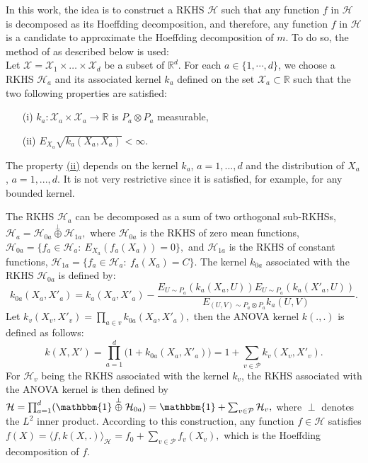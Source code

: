In this work, the idea is to construct a RKHS $\mathcal{H}$ such that any function $f$ in $\mathcal{H}$ is decomposed as its Hoeffding decomposition, and therefore, any function $f$ in $\mathcal{H}$ is a candidate to approximate the Hoeffding decomposition of $m$.  
To do so, the method of \citet{DURRANDE201357} as described below is used:\\ 
Let $\mathcal{X} = \mathcal{X}_{1} \times \ldots \times \mathcal{X}_{d}$ be a subset
of $\mathbb{R}^{d}$. For each $a\in \{1,\cdots,d\}$, we choose a RKHS  $\mathcal{H}_{a}$ and its associated kernel $k_{a}$ defined on the set $\mathcal{X}_{a} \subset \mathbb{R}$ such that the two following properties are satisfied:
\begin{itemize}
\item[(i)]\label{intro:idurr} $k_{a}:\mathcal{X}_{a} \times \mathcal{X}_{a} \rightarrow \mathbb{R}$ is $P_{a}\otimes P_{a}$ measurable,
\item[(ii)]\label{intro:iidurr} $E_{X_{a}}\sqrt{k_{a}(X_{a}, X_{a})} < \infty$.
\end{itemize}
The property \hyperref[intro:iidurr]{(ii)} depends on the kernel $k_a$, $a=1,...,d$ and the distribution of $X_a$, $a=1,...,d$. It is not very restrictive since it is satisfied, for example, for any bounded kernel.

The RKHS $\mathcal{H}_{a}$ can be decomposed as a sum of two orthogonal
sub-RKHSs, $\mathcal{H}_{a} = \mathcal{H}_{0 a}\stackrel{\perp}{\oplus} \mathcal{H}_{1 a},$
where $\mathcal{H}_{0 a}$ is the RKHS of zero mean functions, $\mathcal{H}_{0 a} = \{ f_{a} \in \mathcal{H}_{a}:\: E_{X_{a}}(f_{a}(X_{a})) =
   0\},$
and $\mathcal{H}_{1 a}$ is the RKHS of constant functions, $\mathcal{H}_{1 a} = \{  f_{a} \in \mathcal{H}_{a}:\: f_{a}(X_{a}) =C \}.$
The kernel $k_{0a}$ associated with the RKHS $\mathcal{H}_{0 a}$ is defined
by:
\begin{equation}
\label{kernelmodify}
k_{0a} (X_{a},X'_{a}) = k_{a}(X_{a},X'_{a}) - 
\frac{E_{U \sim P_{a}}(k_{a}(X_{a},U))E_{U \sim P_{a}}(k_{a}(X'_{a},U))}
{E_{(U,V)\sim P_{a}\otimes P_{a}}k_{a}(U,V)}.
\end{equation} 
Let $k_{v}(X_{v}, X'_{v}) = \prod_{a \in v} k_{0a} (X_{a},X'_{a}),$ then the  ANOVA kernel $k(.,.)$ is defined as follows:
\begin{equation*}
 k(X, X') = \prod_{a=1}^{d} 
\Big(1+k_{0a}(X_{a}, X'_{a})\Big) = 
1 + \sum_{v \in \mathcal{P}} k_{v}(X_{v}, X'_{v}).
\end{equation*}
For $\mathcal{H}_{v}$ being the RKHS associated with the kernel $k_{v}$, the 
RKHS associated with the ANOVA kernel is then defined by $\mathcal{H} = \prod_{a=1}^{d}( \mathbbm{1} \stackrel{\perp}{\oplus}
   \mathcal{H}_{0a}) = \mathbbm{1} + \sum_{v \in \mathcal{P}} \mathcal{H}_{v},$
where $\perp$ denotes the $L^2$ inner product.
According to this construction, any function $f \in \mathcal{H}$ satisfies $f(X)=\langle f,k(X,.)\rangle_\mathcal{H}=f_0+\sum_{v\in\mathcal{P}}f_v(X_v),$
which is the Hoeffding decomposition of $f$. 
 
